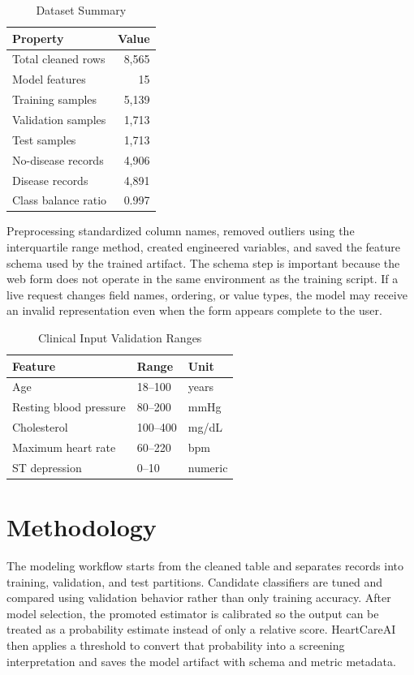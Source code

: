 \documentclass[conference]{IEEEtran}
\begin{document}
\begin{table}[!t]
\caption{Dataset Summary}
\label{tab:dataset}
\centering
\begin{tabular}{lr}
\toprule
\textbf{Property} & \textbf{Value} \\
\midrule
Total cleaned rows & 8,565 \\
Model features & 15 \\
Training samples & 5,139 \\
Validation samples & 1,713 \\
Test samples & 1,713 \\
No-disease records & 4,906 \\
Disease records & 4,891 \\
Class balance ratio & 0.997 \\
\bottomrule
\end{tabular}
\end{table}

Preprocessing standardized column names, removed outliers using the interquartile range method, created engineered variables, and saved the feature schema used by the trained artifact. The schema step is important because the web form does not operate in the same environment as the training script. If a live request changes field names, ordering, or value types, the model may receive an invalid representation even when the form appears complete to the user.

\begin{table}[!t]
\caption{Clinical Input Validation Ranges}
\label{tab:ranges}
\centering
\begin{tabular}{lll}
\toprule
\textbf{Feature} & \textbf{Range} & \textbf{Unit} \\
\midrule
Age & 18--100 & years \\
Resting blood pressure & 80--200 & mmHg \\
Cholesterol & 100--400 & mg/dL \\
Maximum heart rate & 60--220 & bpm \\
ST depression & 0--10 & numeric \\
\bottomrule
\end{tabular}
\end{table}

\section{Methodology}
The modeling workflow starts from the cleaned table and separates records into training, validation, and test partitions. Candidate classifiers are tuned and compared using validation behavior rather than only training accuracy. After model selection, the promoted estimator is calibrated so the output can be treated as a probability estimate instead of only a relative score. HeartCareAI then applies a threshold to convert that probability into a screening interpretation and saves the model artifact with schema and metric metadata.
\end{document}
